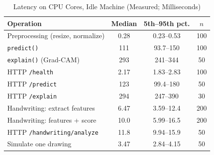 \begin{table}[t]
\centering
\caption{Latency on \CpuCount{} CPU Cores, Idle Machine (Measured; Milliseconds)}
\label{tab:latency}
\footnotesize
\begin{tabular}{@{}lccc@{}}
\toprule
Operation & Median & 5th--95th pct. & $n$ \\
\midrule
Preprocessing (resize, normalize) & 0.28 & 0.23--0.53 & 100 \\
\texttt{predict()} & 111 & 93.7--150 & 100 \\
\texttt{explain()} (Grad-CAM) & 293 & 241--344 & 50 \\
HTTP \texttt{/health} & 2.17 & 1.83--2.83 & 100 \\
HTTP \texttt{/predict} & 123 & 99.4--180 & 50 \\
HTTP \texttt{/explain} & 294 & 247--390 & 30 \\
Handwriting: extract features & 6.47 & 3.59--12.4 & 200 \\
Handwriting: features + score & 10.0 & 5.99--16.5 & 200 \\
HTTP \texttt{/handwriting/analyze} & 11.8 & 9.94--15.9 & 50 \\
Simulate one drawing & 3.47 & 2.84--4.15 & 50 \\
\bottomrule
\end{tabular}
\end{table}
